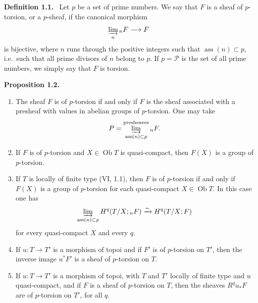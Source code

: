 \documentclass[11pt]{article}
\newcommand{\Ob}{\operatorname{Ob}}
\newcommand{\Ass}{\operatorname{ass}}
\newcommand{\ie}{i.e.\ }
\newenvironment{statement}[1]{\par\medskip\noindent\textbf{#1.}\ }{\par\medskip}
\begin{document}
\begin{statement}{Definition 1.1}
Let \(p\) be a set of prime numbers. We say that \(F\) is a sheaf of \(p\)-torsion, or a \(p\)-sheaf, if the canonical morphism
\[
\varinjlim_n {}_nF\longrightarrow F
\]
is bijective, where \(n\) runs through the positive integers such that \(\Ass(n)\subset p\), \ie such that all prime divisors of \(n\) belong to \(p\). If \(p=\mathcal P\) is the set of all prime numbers, we simply say that \(F\) is torsion.
\end{statement}

\begin{statement}{Proposition 1.2}
\begin{enumerate}[label=(\roman*)]
\item The sheaf \(F\) is of \(p\)-torsion if and only if \(F\) is the sheaf associated with a presheaf with values in abelian groups of \(p\)-torsion. One may take
\[
P=\varinjlim_{\Ass(n)\subset p}^{\mathrm{presheaves}}{}_nF.
\]
\item If \(F\) is of \(p\)-torsion and \(X\in\Ob T\) is quasi-compact, then \(F(X)\) is a group of \(p\)-torsion.
\item If \(T\) is locally of finite type (VI, 1.1), then \(F\) is of \(p\)-torsion if and only if \(F(X)\) is a group of \(p\)-torsion for each quasi-compact \(X\in\Ob T\). In this case one has
\[
\varinjlim_{\Ass(n)\subset p}H^q(T/X;{}_nF)\xrightarrow{\sim}H^q(T/X;F)
\]
for every quasi-compact \(X\) and every \(q\).
\item If \(u:T\to T'\) is a morphism of topoi and if \(F'\) is of \(p\)-torsion on \(T'\), then the inverse image \(u^*F'\) is a sheaf of \(p\)-torsion on \(T\).
\item If \(u:T\to T'\) is a morphism of topoi, with \(T\) and \(T'\) locally of finite type and \(u\) quasi-compact, and if \(F\) is a sheaf of \(p\)-torsion on \(T\), then the sheaves \(R^qu_*F\) are of \(p\)-torsion on \(T'\), for all \(q\).
\end{enumerate}
\end{statement}
\end{document}
